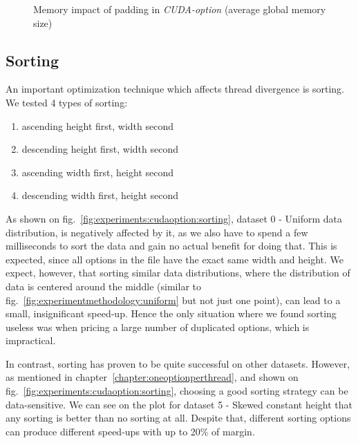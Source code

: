 \begin{figure}[H]
\begin{subfigure}{.49\textwidth}
\end{subfigure}
\begin{center}
  \small
\end{center}
\begin{center}
  \small
\end{center}
\caption{Memory impact of padding in \textit{CUDA-option} (average global memory size)}
\label{fig:experiments:cudaoption:memory}
\end{figure}

\newpage
\subsection{Sorting}
\label{section:sortingcudaoption}
An important optimization technique which affects thread divergence is sorting. We tested 4 types of sorting:
\begin{enumerate}
    \item ascending height first, width second
    \item descending height first, width second
    \item ascending width first, height second
    \item descending width first, height second
\end{enumerate}

As shown on fig.~\ref{fig:experiments:cudaoption:sorting}, dataset 0 - Uniform data distribution, is negatively affected by it, as we also have to spend a few milliseconds to sort the data and gain no actual benefit for doing that. This is expected, since all options in the file have the exact same width and height. We expect, however, that sorting similar data distributions, where the distribution of data is centered around the middle (similar to fig.~\ref{fig:experimentmethodology:uniform} but not just one point), can lead to a small, insignificant speed-up. Hence the only situation where we found sorting useless was when pricing a large number of duplicated options, which is impractical.  

In contrast, sorting has proven to be quite successful on other datasets. However, as mentioned in chapter~\ref{chapter:oneoptionperthread}, and shown on fig.~\ref{fig:experiments:cudaoption:sorting}, choosing a good sorting strategy can be data-sensitive. We can see on the plot for dataset 5 - Skewed constant height that any sorting is better than no sorting at all. Despite that, different sorting options can produce different speed-ups with up to 20\% of margin.

